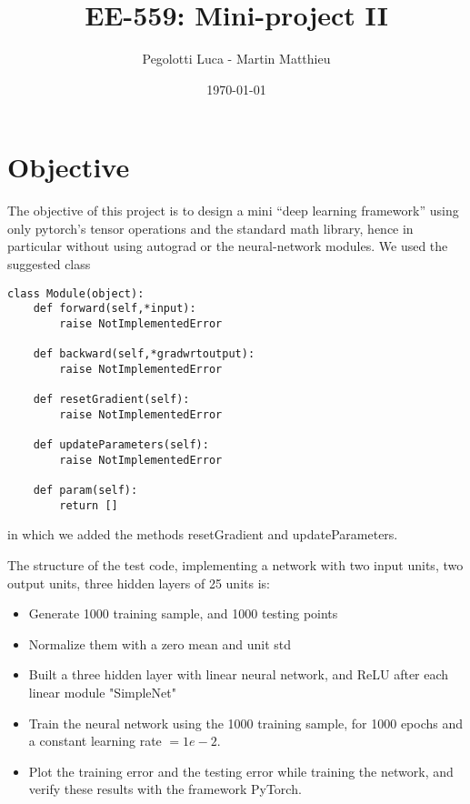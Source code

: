 \documentclass[10pt,final,a4paper]{article}
\begin{document}
\title{EE-559: Mini-project II}
\author{Pegolotti Luca - Martin Matthieu}

\date{\today}
\maketitle


\section{Objective}

The objective of this project is to design a mini “deep learning framework” using only pytorch’s tensor operations and the standard math library, hence in particular without using autograd or the neural-network modules.
We used the suggested class
\begin{verbatim}
class Module(object):
    def forward(self,*input):
        raise NotImplementedError

    def backward(self,*gradwrtoutput):
        raise NotImplementedError

    def resetGradient(self):
        raise NotImplementedError

    def updateParameters(self):
        raise NotImplementedError

    def param(self):
        return []
\end{verbatim}
in which we added the methods resetGradient and updateParameters.

The structure of the test code, implementing a network with two input units, two output units, three hidden layers of 25 units is:
\begin{itemize}
\item Generate 1000 training sample, and 1000 testing points\\
\item Normalize them with a zero mean and unit std\\
\item Built a three hidden layer with linear neural network, and ReLU after each linear module "SimpleNet"\\
\item Train the neural network using the 1000 training sample, for 1000 epochs and a constant learning rate $=1e-2$.
\item Plot the training error and the testing error while training the network, and verify these results with the framework PyTorch.
\end{itemize}
\end{document}
